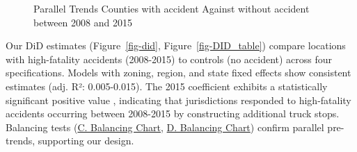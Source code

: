 \documentclass[
  12pt]{article}
\begin{document}
\begin{figure}


\caption{\label{fig-trends_mid}Parallel Trends Counties with accident
Against without accident between 2008 and 2015}

\end{figure}%

Our DiD estimates (Figure~\ref{fig-did}, Figure~\ref{fig-DID_table})
compare locations with high-fatality accidents (2008-2015) to controls
(no accident) across four specifications. Models with zoning, region,
and state fixed effects show consistent estimates (adj. R²:
0.005-0.015). The 2015 coefficient exhibits a statistically significant
positive value , indicating that jurisdictions responded to
high-fatality accidents occurring between 2008-2015 by constructing
additional truck stops. Balancing tests
(\hyperref[sec-c.-balancing_chart_region]{C. Balancing Chart},
\hyperref[sec-D.balancing_chart_state]{D. Balancing Chart}) confirm
parallel pre-trends, supporting our design.
\end{document}
